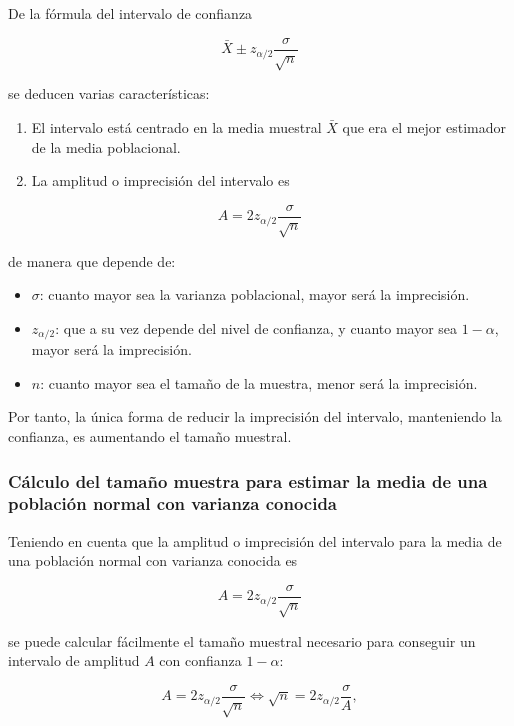 \documentclass[
  a4paper,
]{scrreport}
\providecommand{\tightlist}{%
  \setlength{\itemsep}{0pt}\setlength{\parskip}{0pt}}\usepackage{longtable,booktabs,array}
\theoremstyle{plain}
\theoremstyle{definition}
\theoremstyle{definition}
\theoremstyle{remark}
\begin{document}
De la fórmula del intervalo de confianza

\[
\bar{X}\pm z_{\alpha/2}\frac{\sigma}{\sqrt{n}}
\]

se deducen varias características:

\begin{enumerate}
\def\labelenumi{\alph{enumi}.}
\item
  El intervalo está centrado en la media muestral \(\bar X\) que era el
  mejor estimador de la media poblacional.
\item
  La amplitud o imprecisión del intervalo es
\end{enumerate}

\[
A= 2 z_{\alpha/2}\frac{\sigma}{\sqrt{n}}
\]

de manera que depende de:

\begin{itemize}
\tightlist
\item
  \(\sigma\): cuanto mayor sea la varianza poblacional, mayor será la
  imprecisión.
\item
  \(z_{\alpha/2}\): que a su vez depende del nivel de confianza, y
  cuanto mayor sea \(1-\alpha\), mayor será la imprecisión.
\item
  \(n\): cuanto mayor sea el tamaño de la muestra, menor será la
  imprecisión.
\end{itemize}

Por tanto, la única forma de reducir la imprecisión del intervalo,
manteniendo la confianza, es aumentando el tamaño muestral.

\subsubsection{Cálculo del tamaño muestra para estimar la media de una
población normal con varianza
conocida}\label{cuxe1lculo-del-tamauxf1o-muestra-para-estimar-la-media-de-una-poblaciuxf3n-normal-con-varianza-conocida}

Teniendo en cuenta que la amplitud o imprecisión del intervalo para la
media de una población normal con varianza conocida es

\[
A= 2 z_{\alpha/2}\frac{\sigma}{\sqrt{n}}
\]

se puede calcular fácilmente el tamaño muestral necesario para conseguir
un intervalo de amplitud \(A\) con confianza \(1-\alpha\):

\[
A= 2 z_{\alpha/2}\frac{\sigma}{\sqrt{n}} \Leftrightarrow \sqrt{n}= 2 z_{\alpha/2}\frac{\sigma}{A},
\]
\end{document}

